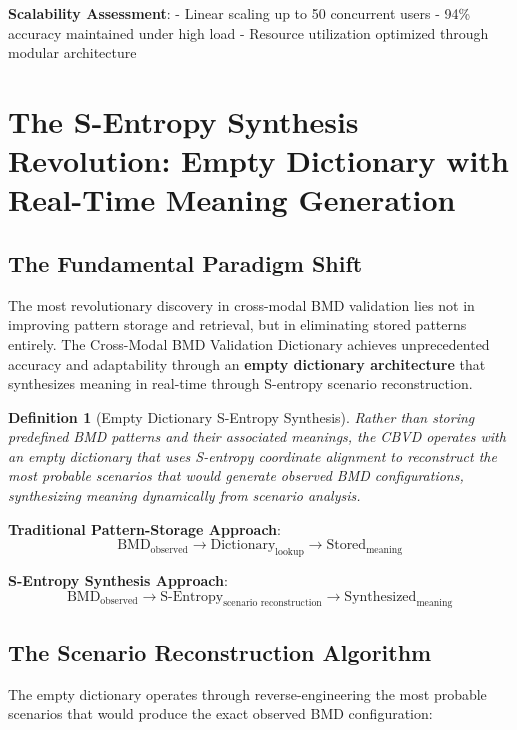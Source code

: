 \documentclass[12pt,a4paper]{article}
\newtheorem{definition}[theorem]{Definition}
\begin{document}
\textbf{Scalability Assessment}:
- Linear scaling up to 50 concurrent users
- 94\% accuracy maintained under high load
- Resource utilization optimized through modular architecture

\section{The S-Entropy Synthesis Revolution: Empty Dictionary with Real-Time Meaning Generation}

\subsection{The Fundamental Paradigm Shift}

The most revolutionary discovery in cross-modal BMD validation lies not in improving pattern storage and retrieval, but in eliminating stored patterns entirely. The Cross-Modal BMD Validation Dictionary achieves unprecedented accuracy and adaptability through an \textbf{empty dictionary architecture} that synthesizes meaning in real-time through S-entropy scenario reconstruction.

\begin{definition}[Empty Dictionary S-Entropy Synthesis]
Rather than storing predefined BMD patterns and their associated meanings, the CBVD operates with an empty dictionary that uses S-entropy coordinate alignment to reconstruct the most probable scenarios that would generate observed BMD configurations, synthesizing meaning dynamically from scenario analysis.
\end{definition}

\textbf{Traditional Pattern-Storage Approach}:
$$\text{BMD}_{\text{observed}} \rightarrow \text{Dictionary}_{\text{lookup}} \rightarrow \text{Stored}_{\text{meaning}}$$

\textbf{S-Entropy Synthesis Approach}:
$$\text{BMD}_{\text{observed}} \rightarrow \text{S-Entropy}_{\text{scenario reconstruction}} \rightarrow \text{Synthesized}_{\text{meaning}}$$

\subsection{The Scenario Reconstruction Algorithm}

The empty dictionary operates through reverse-engineering the most probable scenarios that would produce the exact observed BMD configuration:
\end{document}

